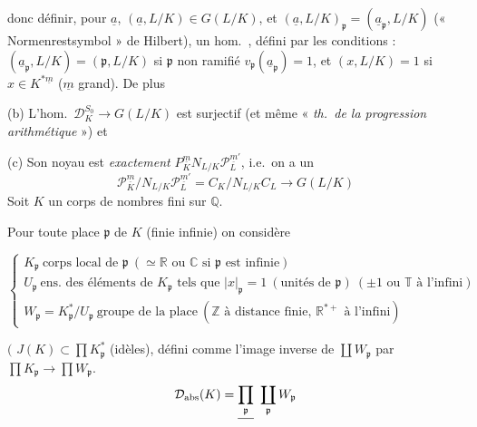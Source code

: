 \documentclass[11pt,a4paper]{article}
\begin{document}
 donc \ill{} définir, pour \struck{\ill{}} 
$\underline{a}$,  $(\underline{a}, L/K) \in G(L/K)$, et
$(\underline{a}, L/K)_{\mathfrak{p}} = (\underline{a}_{\mathfrak{p}}, L/K)$
(« Normenrestsymbol » de Hilbert),  un hom.\ ,
défini par les conditions : $(\underline{a}_{\mathfrak{p}}, L/K) =
(\mathfrak{p}, L/K)$ si $\mathfrak{p}$  non ramifié
 $v_{\mathfrak{p}}(\underline{a}_{\mathfrak{p}}) = 1$, et
$(x, L/K) = 1$ si \struck{\ill{}} $x \in K^{*\underline{m}}$
($\underline{m}$ grand). De plus

(b) L'hom.\ $\mathcal{D}^{S_0}_{K} \to G(L/K)$ est surjectif (et même
\ill{} \ill{} « \emph{th.\ de la progression arithmétique} ») et

(c) Son noyau est \emph{exactement} $P^{\underline{m}}_{K} N_{L/K}\mathcal{P}^{\underline{m}'}_{L}$,
i.e.\ on a un 
\[
\mathcal{P}^{\underline{m}}_{K}/N_{L/K}\mathcal{P}^{\underline{m}'}_{L} = C_K/N_{L/K}C_L \to G(L/K)
\]
Soit $K$ un corps de nombres fini sur $\mathbb{Q}$.

Pour toute place $\mathfrak{p}$ de $K$ (finie  infinie) on considère

$\left\lbrace
\begin{array}{l}
K_{\mathfrak{p}} \ \text{corps local de } \mathfrak{p} \ (\simeq \mathbb{R} \text{ ou } \mathbb{C} \text{ si } \mathfrak{p} \text{ est infinie}) \\
U_{\mathfrak{p}} \ \text{ens.\ des éléments de } K_{\mathfrak{p}} \text{ tels que } |x|_{\mathfrak{p}} = 1 \ (\text{unités de } \mathfrak{p}) \ (\pm 1 \text{ ou } \mathbb{T} \text{ à l'infini}) \\
W_{\mathfrak{p}} = K^{*}_{\mathfrak{p}}/U_{\mathfrak{p}} \ \text{groupe de la place} \ (\mathbb{Z} \text{ à distance finie, } \mathbb{R}^{*+} \text{ à l'infini})
\end{array}\right.$

$\bigl($ $J(K) \subset \prod K^{*}_{\mathfrak{p}}$ (idèles), défini comme
l'image inverse de $\coprod W_{\mathfrak{p}}$ par $\prod K_{\mathfrak{p}} \to
\prod W_{\mathfrak{p}}$.  \ill{}
\[
\mathcal{D}_{\mathrm{abs}}(K) = \struck{\prod_{\mathfrak{p}}}\ \coprod_{\mathfrak{p}} W_{\mathfrak{p}}
\]
\end{document}
